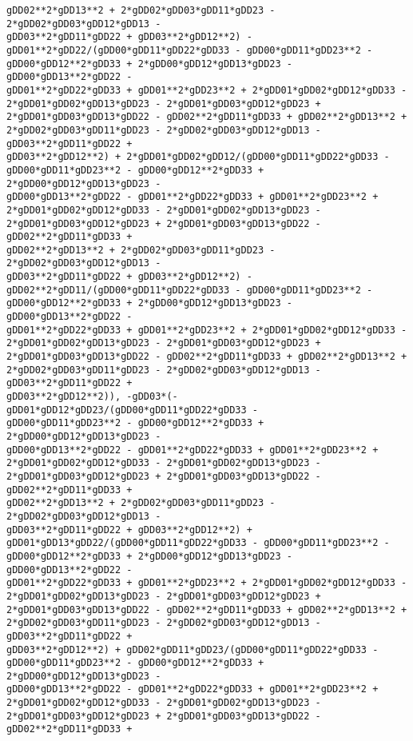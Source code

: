 \documentclass[landscape,letterpaper,10pt,english]{article}
\begin{document}
\begin{Verbatim}[commandchars=\\\{\}]
gDD02**2*gDD13**2 + 2*gDD02*gDD03*gDD11*gDD23 - 2*gDD02*gDD03*gDD12*gDD13 -
gDD03**2*gDD11*gDD22 + gDD03**2*gDD12**2) -
gDD01**2*gDD22/(gDD00*gDD11*gDD22*gDD33 - gDD00*gDD11*gDD23**2 -
gDD00*gDD12**2*gDD33 + 2*gDD00*gDD12*gDD13*gDD23 - gDD00*gDD13**2*gDD22 -
gDD01**2*gDD22*gDD33 + gDD01**2*gDD23**2 + 2*gDD01*gDD02*gDD12*gDD33 -
2*gDD01*gDD02*gDD13*gDD23 - 2*gDD01*gDD03*gDD12*gDD23 +
2*gDD01*gDD03*gDD13*gDD22 - gDD02**2*gDD11*gDD33 + gDD02**2*gDD13**2 +
2*gDD02*gDD03*gDD11*gDD23 - 2*gDD02*gDD03*gDD12*gDD13 - gDD03**2*gDD11*gDD22 +
gDD03**2*gDD12**2) + 2*gDD01*gDD02*gDD12/(gDD00*gDD11*gDD22*gDD33 -
gDD00*gDD11*gDD23**2 - gDD00*gDD12**2*gDD33 + 2*gDD00*gDD12*gDD13*gDD23 -
gDD00*gDD13**2*gDD22 - gDD01**2*gDD22*gDD33 + gDD01**2*gDD23**2 +
2*gDD01*gDD02*gDD12*gDD33 - 2*gDD01*gDD02*gDD13*gDD23 -
2*gDD01*gDD03*gDD12*gDD23 + 2*gDD01*gDD03*gDD13*gDD22 - gDD02**2*gDD11*gDD33 +
gDD02**2*gDD13**2 + 2*gDD02*gDD03*gDD11*gDD23 - 2*gDD02*gDD03*gDD12*gDD13 -
gDD03**2*gDD11*gDD22 + gDD03**2*gDD12**2) -
gDD02**2*gDD11/(gDD00*gDD11*gDD22*gDD33 - gDD00*gDD11*gDD23**2 -
gDD00*gDD12**2*gDD33 + 2*gDD00*gDD12*gDD13*gDD23 - gDD00*gDD13**2*gDD22 -
gDD01**2*gDD22*gDD33 + gDD01**2*gDD23**2 + 2*gDD01*gDD02*gDD12*gDD33 -
2*gDD01*gDD02*gDD13*gDD23 - 2*gDD01*gDD03*gDD12*gDD23 +
2*gDD01*gDD03*gDD13*gDD22 - gDD02**2*gDD11*gDD33 + gDD02**2*gDD13**2 +
2*gDD02*gDD03*gDD11*gDD23 - 2*gDD02*gDD03*gDD12*gDD13 - gDD03**2*gDD11*gDD22 +
gDD03**2*gDD12**2)), -gDD03*(-gDD01*gDD12*gDD23/(gDD00*gDD11*gDD22*gDD33 -
gDD00*gDD11*gDD23**2 - gDD00*gDD12**2*gDD33 + 2*gDD00*gDD12*gDD13*gDD23 -
gDD00*gDD13**2*gDD22 - gDD01**2*gDD22*gDD33 + gDD01**2*gDD23**2 +
2*gDD01*gDD02*gDD12*gDD33 - 2*gDD01*gDD02*gDD13*gDD23 -
2*gDD01*gDD03*gDD12*gDD23 + 2*gDD01*gDD03*gDD13*gDD22 - gDD02**2*gDD11*gDD33 +
gDD02**2*gDD13**2 + 2*gDD02*gDD03*gDD11*gDD23 - 2*gDD02*gDD03*gDD12*gDD13 -
gDD03**2*gDD11*gDD22 + gDD03**2*gDD12**2) +
gDD01*gDD13*gDD22/(gDD00*gDD11*gDD22*gDD33 - gDD00*gDD11*gDD23**2 -
gDD00*gDD12**2*gDD33 + 2*gDD00*gDD12*gDD13*gDD23 - gDD00*gDD13**2*gDD22 -
gDD01**2*gDD22*gDD33 + gDD01**2*gDD23**2 + 2*gDD01*gDD02*gDD12*gDD33 -
2*gDD01*gDD02*gDD13*gDD23 - 2*gDD01*gDD03*gDD12*gDD23 +
2*gDD01*gDD03*gDD13*gDD22 - gDD02**2*gDD11*gDD33 + gDD02**2*gDD13**2 +
2*gDD02*gDD03*gDD11*gDD23 - 2*gDD02*gDD03*gDD12*gDD13 - gDD03**2*gDD11*gDD22 +
gDD03**2*gDD12**2) + gDD02*gDD11*gDD23/(gDD00*gDD11*gDD22*gDD33 -
gDD00*gDD11*gDD23**2 - gDD00*gDD12**2*gDD33 + 2*gDD00*gDD12*gDD13*gDD23 -
gDD00*gDD13**2*gDD22 - gDD01**2*gDD22*gDD33 + gDD01**2*gDD23**2 +
2*gDD01*gDD02*gDD12*gDD33 - 2*gDD01*gDD02*gDD13*gDD23 -
2*gDD01*gDD03*gDD12*gDD23 + 2*gDD01*gDD03*gDD13*gDD22 - gDD02**2*gDD11*gDD33 +

\end{Verbatim}
\end{document}
